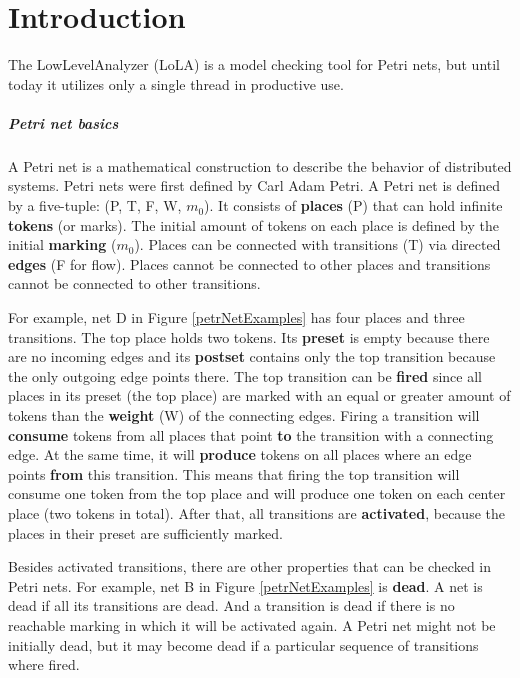 \chapter{Introduction}
\label{introduction}

The LowLevelAnalyzer (LoLA) is a model checking tool for Petri nets, but until today it utilizes only a single thread in productive use.

\paragraph*{Petri net basics}
A Petri net is a mathematical construction to describe the behavior of distributed systems. Petri nets were first defined by Carl Adam Petri\cite{Petri1962kommunikation}. A Petri net is defined by a five-tuple: (P, T, F, W, $m_0$). It consists of \textbf{places} (P) that can hold infinite \textbf{tokens} (or marks). The initial amount of tokens on each place is defined by the initial \textbf{marking} ($m_0$). Places can be connected with transitions (T) via directed \textbf{edges} (F for flow). Places cannot be connected to other places and transitions cannot be connected to other transitions.

For example, net D in Figure \ref{petrNetExamples} has four places and three transitions. The top place holds two tokens. Its \textbf{preset} is empty because there are no incoming edges and its \textbf{postset} contains only the top transition because the only outgoing edge points there. The top transition can be \textbf{fired} since all places in its preset (the top place) are marked with an equal or greater amount of tokens than the \textbf{weight} (W) of the connecting edges. Firing a transition will \textbf{consume} tokens from all places that point \textbf{to} the transition with a connecting edge. At the same time, it will \textbf{produce} tokens on all places where an edge points \textbf{from} this transition. This means that firing the top transition will consume one token from the top place and will produce one token on each center place (two tokens in total). After that, all transitions are \textbf{activated}, because the places in their preset are sufficiently marked.

Besides activated transitions, there are other properties\cite{murata1989petri} that can be checked in Petri nets. For example, net B in Figure \ref{petrNetExamples} is \textbf{dead}. A net is dead if all its transitions are dead. And a transition is dead if there is no reachable marking in which it will be activated again. A Petri net might not be initially dead, but it may become dead if a particular sequence of transitions where fired.

